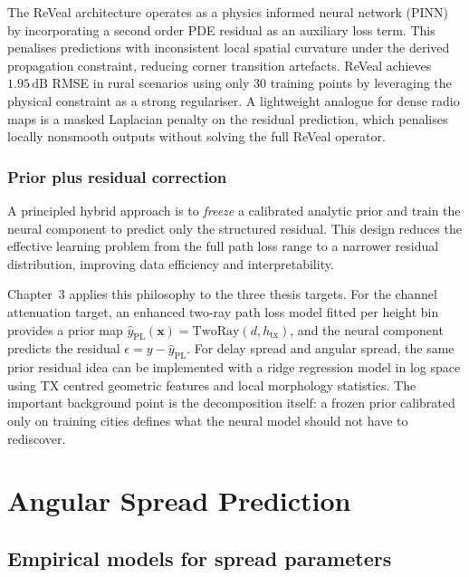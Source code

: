 The ReVeal architecture \cite{reveal2025} operates as a physics informed neural
network (PINN) by incorporating a second order PDE residual as an auxiliary loss
term.  This penalises predictions with inconsistent local spatial curvature
under the derived propagation constraint, reducing corner transition artefacts.
ReVeal achieves~$1.95\,\mathrm{dB}$ RMSE in rural scenarios using only 30
training points by leveraging the physical constraint as a strong regulariser.
A lightweight analogue for dense radio maps is a masked Laplacian penalty on
the residual prediction, which penalises locally nonsmooth outputs without
solving the full ReVeal operator.

\subsubsection{Prior plus residual correction}

A principled hybrid approach is to \emph{freeze} a calibrated analytic prior and
train the neural component to predict only the structured residual.  This design
reduces the effective learning problem from the full path loss range to a
narrower residual distribution, improving data efficiency and interpretability.

Chapter~3 applies this philosophy to the three thesis targets. For the channel
attenuation target, an enhanced two-ray path loss model fitted per height bin provides a prior map
$\hat{y}_{\mathrm{PL}}(\textbf{x}) = \mathrm{TwoRay}(d, h_{\mathrm{tx}})$,
and the neural component predicts the residual
$\epsilon = y - \hat{y}_{\mathrm{PL}}$. For delay spread and angular spread,
the same prior residual idea can be implemented with a ridge regression model
in log space using TX centred geometric features and local morphology
statistics. The important background point is the decomposition itself: a
frozen prior calibrated only on training cities defines what the neural model
should not have to rediscover.

\section{Angular Spread Prediction}
\label{sec:soa_stats}

\subsection{Empirical models for spread parameters}


